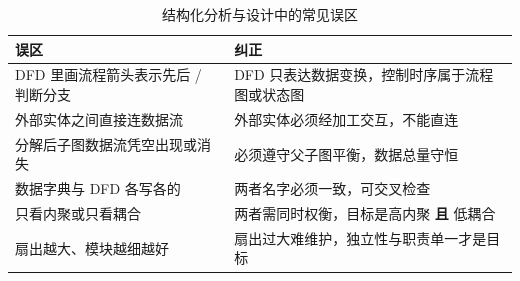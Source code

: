 \begin{table}[H]
\centering
\caption{结构化分析与设计中的常见误区}
\begin{tabulary}{\textwidth}{LL}
\toprule
误区 & 纠正 \\
\midrule
DFD 里画流程箭头表示先后 / 判断分支 & DFD 只表达数据变换，控制时序属于流程图或状态图 \\
外部实体之间直接连数据流 & 外部实体必须经加工交互，不能直连 \\
分解后子图数据流凭空出现或消失 & 必须遵守父子图平衡，数据总量守恒 \\
数据字典与 DFD 各写各的 & 两者名字必须一致，可交叉检查 \\
只看内聚或只看耦合 & 两者需同时权衡，目标是高内聚 \textbf{且} 低耦合 \\
扇出越大、模块越细越好 & 扇出过大难维护，独立性与职责单一才是目标 \\
\bottomrule
\end{tabulary}
\end{table}
